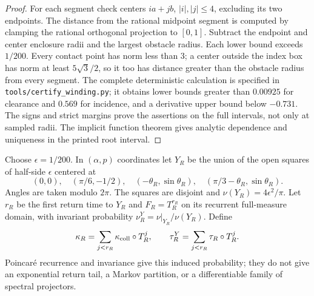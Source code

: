 \begin{proof}
For each segment check centers $ia+jb$, $|i|,|j|\le4$, excluding its two endpoints. The distance from the rational midpoint segment is computed by clamping the rational orthogonal projection to $[0,1]$. Subtract the endpoint and center enclosure radii and the largest obstacle radius. Each lower bound exceeds $1/200$. Every contact point has norm less than 3; a center outside the index box has norm at least $5\sqrt3/2$, so it too has distance greater than the obstacle radius from every segment. The complete deterministic calculation is specified in \texttt{tools/certify\_winding.py}; it obtains lower bounds greater than $0.00925$ for clearance and $0.569$ for incidence, and a derivative upper bound below $-0.731$. The signs and strict margins prove the assertions on the full intervals, not only at sampled radii. The implicit function theorem gives analytic dependence and uniqueness in the printed root interval.
\end{proof}

Choose $\epsilon=1/200$. In $(\alpha,p)$ coordinates let $Y_R$ be the union of the open squares of half-side $\epsilon$ centered at
\begin{equation}\label{eq:Y}
 (0,0),\quad(\pi/6,-1/2),\quad
 (-\theta_R,\sin\theta_R),\quad
 (\pi/3-\theta_R,\sin\theta_R).
\end{equation}
Angles are taken modulo $2\pi$. The squares are disjoint and
$\nu(Y_R)=4\epsilon^2/\pi$. Let $r_R$ be the first return time to $Y_R$ and $F_R=T_R^{r_R}$ on its recurrent full-measure domain, with invariant probability $\nu_R^Y=\nu|_{Y_R}/\nu(Y_R)$. Define
\begin{equation}\label{eq:induced}
 \kappa_R=\sum_{j<r_R}\kappa_{\rm coll}\circ T_R^j,
 \qquad \tau_R^Y=\sum_{j<r_R}\tau_R\circ T_R^j.
\end{equation}
Poincar\'e recurrence and invariance give this induced probability; they do not give an exponential return tail, a Markov partition, or a differentiable family of spectral projectors.

